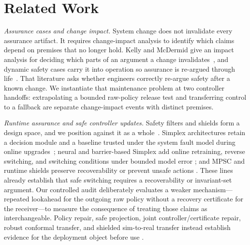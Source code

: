 \section{Related Work}
\label{sec:related}

\emph{Assurance cases and change impact.}
System change does not invalidate every assurance artifact.  It requires
change-impact analysis to identify which claims depend on premises that no
longer hold.  Kelly and McDermid give an impact analysis for deciding which
parts of an argument a change invalidates~\cite{kelly_safety_case_maintenance_2001}, and
dynamic safety cases carry it into operation so assurance is re-argued through
life~\cite{denney_dynamic_safety_cases_2015}.  That literature asks whether
engineers correctly re-argue safety after a known change.  We instantiate that
maintenance problem at two controller handoffs: extrapolating a bounded
raw-policy release test and transferring control to a fallback are separate
change-impact events with distinct premises.

\emph{Runtime assurance and safe controller updates.}
Safety filters and shields form a design space, and we position against it as
a whole~\cite{brunke_safe_learning_survey_2022}.
Simplex architectures retain a decision module and a baseline trusted under
the system fault model during online upgrades~\cite{seto_simplex_1998}; neural
and barrier-based Simplex add online retraining, reverse switching, and
switching conditions under bounded model error
\cite{phan_neural_simplex_2020,damare_bb_simplex_2025}; and MPSC and runtime
shields preserve recoverability or prevent unsafe actions
\cite{wabersich_linear_mpsc_2018,didier_adaptive_mpsc_2021,
alshiekh_shielding_2018}.  These lines already establish that safe switching
requires a recoverability or invariant-set argument.  Our controlled audit
deliberately evaluates a weaker mechanism---repeated lookahead for the outgoing
raw policy without a recovery certificate for the receiver---to measure the
consequence of treating those claims as interchangeable.  Policy repair, safe projection, joint
controller/certificate repair, robust conformal transfer, and shielded
sim-to-real transfer instead establish evidence for the deployment object
before use \cite{zhou_runtime_policy_repair_2020,lu_repair_preservation_2024,
chow_safe_policy_2021,yu_certificate_repair_2025,
mirzaeedodangeh_safe_updates_2026,hsu_sim_lab_real_2023}.

